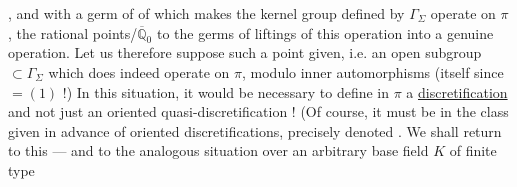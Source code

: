 ,
and with a germ of 
of
\unsure{)|,}
which makes the kernel  group
defined by $\Gamma_{\Sigma}$ operate  on $\pi$, the rational points/$\overline{\mathbb Q}_0$
 to the
 germs of liftings of
this operation\unsure{,}  into a genuine operation.
Let us therefore suppose such a point given, i.e.
  an open subgroup
$\subset\Gamma_{\Sigma}$
which does indeed operate on $\pi$,
 modulo inner automorphisms
(itself 
since \unsure{$\pi^{\Gamma}$|$\overline\pi^{\Gamma}$}$=(1)$ !)
In this situation, it would be necessary to define in $\pi$
a \uline{discretification}
and not just an oriented quasi-discretification !
 (Of course, it must be in the class   given in advance
of  oriented discretifications, 
precisely denoted .
We shall return to this --- and to the analogous situation over an arbitrary
base field $K$ of finite type


